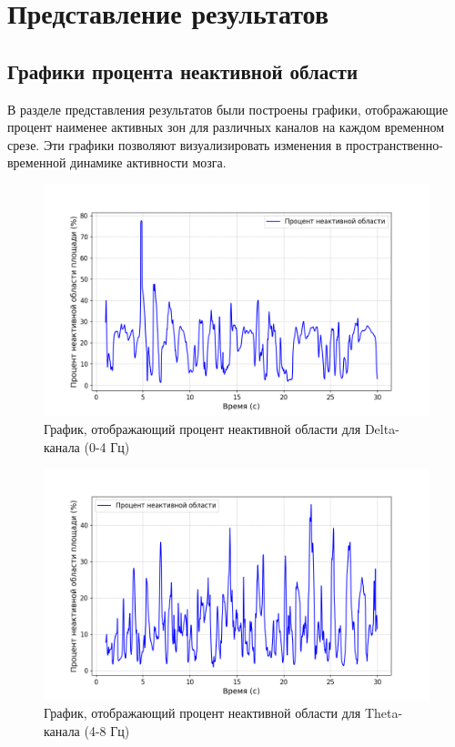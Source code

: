\chapter{Представление результатов}
\section{Графики процента неактивной области}
    В разделе представления результатов были построены графики, отображающие процент наименее активных зон для различных каналов на каждом временном срезе. Эти графики позволяют визуализировать изменения в пространственно-временной динамике активности мозга.
    \begin{figure}[ht]
        \centering
        \includegraphics[width=1\textwidth]{images/delta_graphic.png}
        \caption{График, отображающий процент неактивной области для Delta-канала (0-4 Гц)}
        \label{fig:delta_graphic}
    \end{figure}
    \begin{figure}[ht]
        \centering
        \includegraphics[width=1\textwidth]{images/theta_graphic.png}
        \caption{График, отображающий процент неактивной области для Theta-канала (4-8 Гц)}
        \label{fig:theta_graphic}
    \end{figure}
